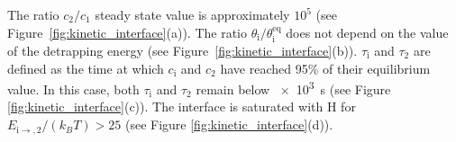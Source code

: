 The ratio $c_2/c_1$ steady state value is approximately $10^5$ (see Figure~\ref{fig:kinetic_interface}(a)).
The ratio $\theta_\mathrm{i}/\theta_\mathrm{i}^\mathrm{eq}$ does not depend on the value of the detrapping energy (see Figure~\ref{fig:kinetic_interface}(b)).
$\tau_\mathrm{i}$ and $\tau_2$ are defined as the time at which $c_\mathrm{i}$ and $c_2$ have reached 95\% of their equilibrium value.
In this case, both $\tau_\mathrm{i}$ and $\tau_2$ remain below \SI{e3}{s} (see Figure \ref{fig:kinetic_interface}(c)).
The interface is saturated with H for $E_{\mathrm{i\rightarrow},2}/(k_B T) > 25$ (see Figure \ref{fig:kinetic_interface}(d)).

